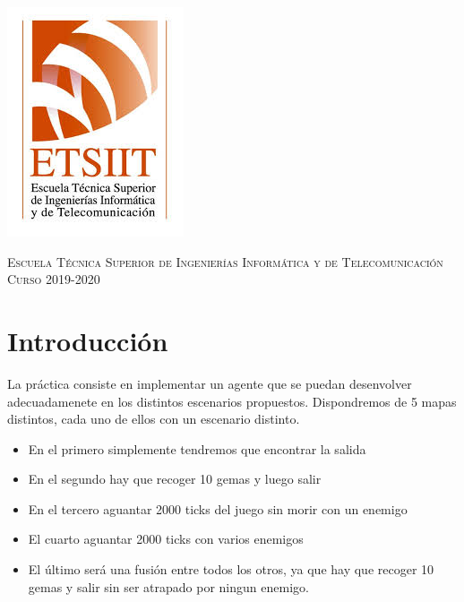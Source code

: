 \documentclass[11pt,a4paper]{article}
\begin{document}
\begin{titlepage}
\begin{minipage}{\textwidth}
\includegraphics[scale=0.3]{img/etsiit.jpeg}

\vspace{0.7cm}
\textsc{Escuela Técnica Superior de Ingenierías Informática y de Telecomunicación}\\
\vspace{1cm}
\textsc{Curso 2019-2020}
\end{minipage}
\end{titlepage}

\tableofcontents
\thispagestyle{empty}				%

\newpage

\setlength{\parskip}{1em}
\setcounter{page}{1}


\section{Introducción}

La práctica consiste en implementar un agente que se puedan desenvolver adecuadamenete en los distintos
escenarios propuestos. Dispondremos de 5 mapas distintos, cada uno de ellos con un escenario distinto.

\begin{itemize}
    \item En el primero simplemente tendremos que encontrar la salida
    \item En el segundo hay que recoger 10 gemas y luego salir
    \item En el tercero aguantar 2000 ticks del juego sin morir con un enemigo
    \item El cuarto aguantar 2000 ticks con varios enemigos
    \item El último será una fusión entre todos los otros, ya que hay que recoger 10 gemas y salir sin
          ser atrapado por ningun enemigo.
\end{itemize}
\end{document}
